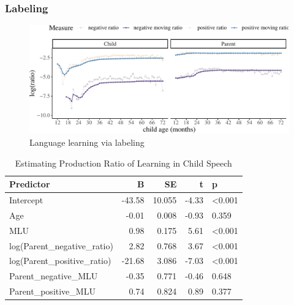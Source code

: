 \documentclass[
  english,
  man,floatsintext]{apa6}
\begin{document}
\clearpage

\hypertarget{labeling}{%
\subsubsection{Labeling}\label{labeling}}

\begin{figure}[H]

{\centering \includegraphics{results_files/figure-latex/learning-1} 

}

\caption{Language learning via labeling}\label{fig:learning}
\end{figure}

\clearpage

\begin{table}

\caption{\label{tab:unnamed-chunk-6}Estimating Production Ratio of Learning in Child Speech}
\centering
\begin{tabular}[t]{l|r|r|r|l}
\hline
Predictor & B & SE & t & p\\
\hline
Intercept & -43.58 & 10.055 & -4.33 & <0.001\\
\hline
Age & -0.01 & 0.008 & -0.93 & 0.359\\
\hline
MLU & 0.98 & 0.175 & 5.61 & <0.001\\
\hline
log(Parent\_negative\_ratio) & 2.82 & 0.768 & 3.67 & <0.001\\
\hline
log(Parent\_positive\_ratio) & -21.68 & 3.086 & -7.03 & <0.001\\
\hline
Parent\_negative\_MLU & -0.35 & 0.771 & -0.46 & 0.648\\
\hline
Parent\_positive\_MLU & 0.74 & 0.824 & 0.89 & 0.377\\
\hline
\end{tabular}
\end{table}
\end{document}
